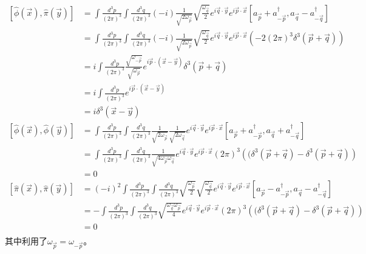 \begin{equation}
\label{chap3equatime}
    \begin{aligned}
     \left[\hat{\phi}(\vec{x}),\hat{\pi}(\vec{y})\right]&=\int \frac{d^{3}p}{(2\pi)^{3}} \int \frac{d^{3}q}{(2\pi)^{3}}(-i)\frac{1}{\sqrt{2\omega_{\vec{p}}}}\sqrt{\frac{\omega_{\vec{q}}}{2}}e^{i\vec{q}\cdot\vec{y}}e^{i\vec{p}\cdot\vec{x}}\left[a_{\vec{p}}+a^{\dagger}_{-\vec{p}},a_{\vec{q}}-a^{\dagger}_{-\vec{q}}\right]\\
     &= \int \frac{d^{3}p}{(2\pi)^{3}} \int \frac{d^{3}q}{(2\pi)^{3}}(-i)\frac{1}{\sqrt{2\omega_{\vec{p}}}}\sqrt{\frac{\omega_{\vec{q}}}{2}}e^{i\vec{q}\cdot\vec{y}}e^{i\vec{p}\cdot\vec{x}}\left(-2(2\pi)^{3}\delta^{3}(\vec{p}+\vec{q})\right)\\
      &= i\int \frac{d^{3}p}{(2\pi)^{3}}\frac{\sqrt{\omega_{-\vec{p}}}}{\sqrt{\omega_{\vec{p}}}}e^{i\vec{p}\cdot(\vec{x}-\vec{y})}\delta^{3}(\vec{p}+\vec{q})\\
      &= i\int \frac{d^{3}p}{(2\pi)^{3}}e^{i\vec{p}\cdot(\vec{x}-\vec{y})}\\
      &= i\delta^{3}(\vec{x}-\vec{y})\\
 \left[\hat{\phi}(\vec{x}),\hat{\phi}(\vec{y})\right]&=\int \frac{d^{3}p}{(2\pi)^{3}} \int \frac{d^{3}q}{(2\pi)^{3}}\frac{1}{\sqrt{2\omega_{\vec{p}}}}\frac{1}{\sqrt{2\omega_{\vec{q}}}}e^{i\vec{q}\cdot\vec{y}}e^{i\vec{p}\cdot\vec{x}}\left[a_{\vec{p}}+a^{\dagger}_{-\vec{p}},a_{\vec{q}}+a^{\dagger}_{-\vec{q}}\right]\\
     &=\int \frac{d^{3}p}{(2\pi)^{3}} \int \frac{d^{3}q}{(2\pi)^{3}}\frac{1}{\sqrt{4\omega_{\vec{p}}\omega_{\vec{q}}}}e^{i\vec{q}\cdot\vec{y}}e^{i\vec{p}\cdot\vec{x}}(2\pi)^{3}\left((\delta^{3}(\vec{p}+\vec{q})-\delta^{3}(\vec{p}+\vec{q})\right)\\
     &=0\\
    \left[\hat{\pi}(\vec{x}),\hat{\pi}(\vec{y})\right]&=(-i)^{2}\int \frac{d^{3}p}{(2\pi)^{3}} \int \frac{d^{3}q}{(2\pi)^{3}}\sqrt{\frac{\omega_{\vec{p}}}{2}}\sqrt{\frac{\omega_{\vec{q}}}{2}}e^{i\vec{q}\cdot\vec{y}}e^{i\vec{p}\cdot\vec{x}}\left[a_{\vec{p}}-a^{\dagger}_{-\vec{p}},a_{\vec{q}}-a^{\dagger}_{-\vec{q}}\right]\\
     &=-\int \frac{d^{3}p}{(2\pi)^{3}} \int \frac{d^{3}q}{(2\pi)^{3}}\sqrt{\frac{\omega_{\vec{q}}\omega_{\vec{p}}}{4}}e^{i\vec{q}\cdot\vec{y}}e^{i\vec{p}\cdot\vec{x}}(2\pi)^{3}\left((\delta^{3}(\vec{p}+\vec{q})-\delta^{3}(\vec{p}+\vec{q})\right)\\
     &=0\\ 
    \end{aligned}
\end{equation}
其中利用了$\omega_{\vec{p}}=\omega_{-\vec{p}}$。

